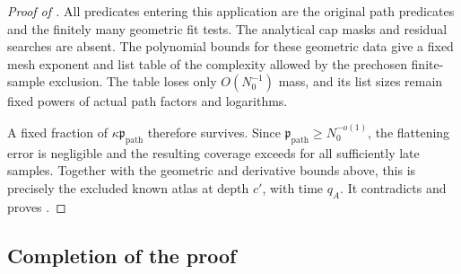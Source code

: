 \begin{proof}[Proof of ]
All predicates entering this application are the original path
predicates and the finitely many geometric fit tests. The analytical
cap masks and residual searches are absent. The polynomial bounds
for these geometric data give a fixed mesh exponent and list table
of the complexity allowed by the prechosen finite-sample exclusion. The
table loses only \(O(N_0^{-1})\) mass, and its list sizes remain fixed
powers of actual path factors and logarithms.

A fixed fraction of \(\kappa\mathfrak p_{\mathrm{path}}\) therefore
survives. Since \(\mathfrak p_{\mathrm{path}}\ge N_0^{-o(1)}\),
the flattening error is negligible and the resulting coverage exceeds
 for all sufficiently late samples.
Together with the geometric and derivative bounds above, this is
precisely the excluded known atlas at depth \(c'\), with time
\(q_A\). It contradicts  and proves
.
\end{proof}

\subsection{Completion of the proof}
\label{proof:main}

